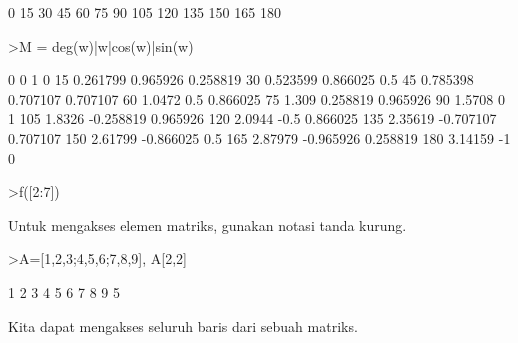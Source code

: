 \documentclass[12pt,arial,letterpaper]{book}
\begin{document}
\begin{eulercomment}
\begin{eulercomment}
\begin{eulercomment}
\begin{eulercomment}
\begin{eulercomment}
\begin{eulercomment}
\begin{eulerprompt}
\end{eulerprompt}
\begin{euleroutput}
              0 
             15 
             30 
             45 
             60 
             75 
             90 
            105 
            120 
            135 
            150 
            165 
            180 
\end{euleroutput}
\begin{eulerprompt}
>M = deg(w)|w|cos(w)|sin(w)
\end{eulerprompt}
\begin{euleroutput}
              0             0             1             0 
             15      0.261799      0.965926      0.258819 
             30      0.523599      0.866025           0.5 
             45      0.785398      0.707107      0.707107 
             60        1.0472           0.5      0.866025 
             75         1.309      0.258819      0.965926 
             90        1.5708             0             1 
            105        1.8326     -0.258819      0.965926 
            120        2.0944          -0.5      0.866025 
            135       2.35619     -0.707107      0.707107 
            150       2.61799     -0.866025           0.5 
            165       2.87979     -0.965926      0.258819 
            180       3.14159            -1             0 
\end{euleroutput}
\begin{eulerprompt}
>f([2:7])
\end{eulerprompt}
\begin{euleroutput}
  [2.05045,  13.7251,  113.336,  1241.03,  17128.1,  284713]
\end{euleroutput}
\begin{eulercomment}
\begin{eulercomment}
\begin{eulercomment}
Untuk mengakses elemen matriks, gunakan notasi tanda kurung.
\end{eulercomment}
\begin{eulerprompt}
>A=[1,2,3;4,5,6;7,8,9], A[2,2]
\end{eulerprompt}
\begin{euleroutput}
              1             2             3 
              4             5             6 
              7             8             9 
  5
\end{euleroutput}
\begin{eulercomment}
Kita dapat mengakses seluruh baris dari sebuah matriks.

\end{eulercomment}
\end{eulercomment}
\end{eulercomment}
\end{eulercomment}
\end{eulercomment}
\end{eulercomment}
\end{eulercomment}
\end{eulercomment}
\end{eulercomment}
\end{document}
